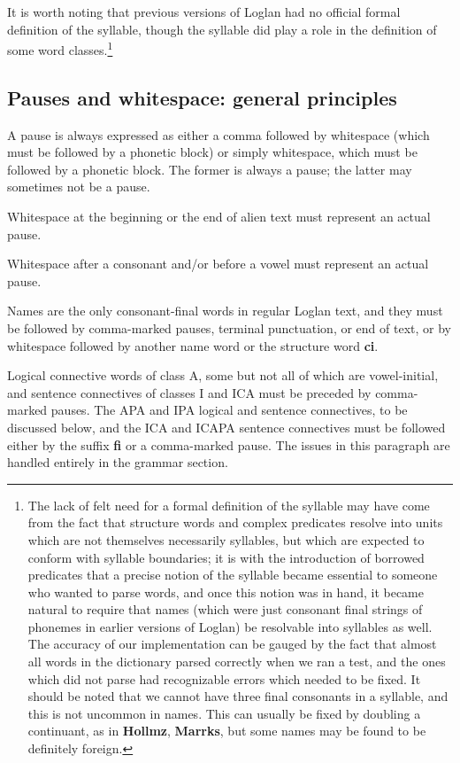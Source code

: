 \documentclass[12pt]{book}
\begin{document}
It is worth noting that previous versions of Loglan had no official formal definition of the syllable, though the syllable did play a role in the definition of some word classes.\footnote{The lack of felt need for a formal definition of the syllable  may have come from the fact that structure words and complex predicates resolve into units which are not themselves necessarily syllables, but which are expected to conform with syllable boundaries;  it is with the introduction of borrowed predicates that a precise notion of the syllable became essential to someone who wanted to parse words, and once this notion was in hand, it became natural to require that names (which were just consonant final strings of phonemes in earlier versions of Loglan) be resolvable into syllables as well.  The accuracy of our implementation can be gauged by the fact that almost all words in the dictionary parsed correctly when we ran a test, and the ones which did not parse had recognizable errors which needed to be fixed.  It should be noted that we cannot have three final consonants in a syllable, and this is not uncommon in names.  This can usually be fixed by doubling a continuant, as in {\bf Hollmz}, {\bf Marrks}, but some names may be found to be definitely foreign.}

\subsection{Pauses and whitespace:  general principles}

A pause is always expressed as either a comma followed by whitespace (which must be followed by a phonetic block) or simply whitespace, which must be followed by a phonetic block.
The former is always a pause;  the latter may sometimes not be a pause.

Whitespace at the beginning or the end of alien text must represent an actual pause.

Whitespace after a consonant and/or before a vowel must represent an actual pause.

Names are the only consonant-final words in regular Loglan text, and they must be followed by comma-marked pauses, terminal punctuation, or end of text, or by whitespace followed by another name word or the structure word {\bf ci}.

Logical connective words of class A, some but not all of which are vowel-initial, and sentence connectives of classes I and ICA must be preceded by comma-marked pauses.  The APA and IPA logical and sentence connectives, to be discussed below, and the ICA and ICAPA sentence connectives must be followed either by the suffix {\bf fi} or a comma-marked pause.  The issues in this paragraph are handled entirely in the grammar section.
\end{document}
